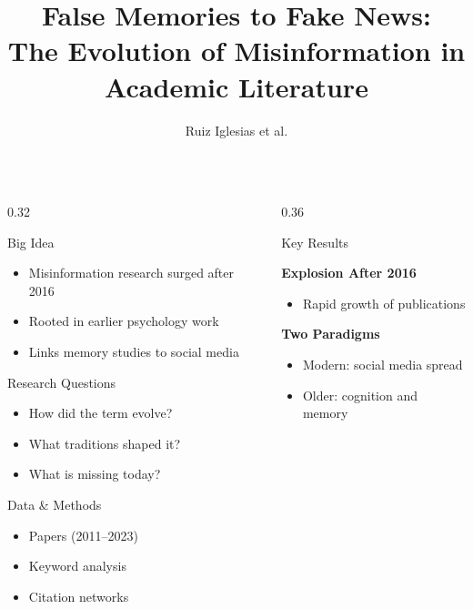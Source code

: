 \documentclass{beamer}
\title{False Memories to Fake News:\\
The Evolution of Misinformation in Academic Literature}
\author{Ruiz Iglesias et al.}
\institute{University of Vermont \\ Computational Story Lab}
\begin{document}
\begin{frame}[t]

\begin{columns}[t,totalwidth=\linewidth]

\begin{column}{0.32\linewidth}

\begin{block}{Big Idea}
\begin{itemize}
\item Misinformation research surged after 2016
\item Rooted in earlier psychology work
\item Links memory studies to social media
\end{itemize}
\end{block}

\begin{block}{Research Questions}
\begin{itemize}
\item How did the term evolve?
\item What traditions shaped it?
\item What is missing today?
\end{itemize}
\end{block}

\begin{block}{Data \& Methods}
\begin{itemize}
\item Papers (2011--2023)
\item Keyword analysis
\item Citation networks
\end{itemize}
\end{block}

\end{column}

\begin{column}{0.36\linewidth}

\begin{block}{Key Results}

\textbf{Explosion After 2016}
\begin{itemize}
\item Rapid growth of publications
\end{itemize}

\vspace{0.5em}

\textbf{Two Paradigms}
\begin{itemize}
\item Modern: social media spread
\item Older: cognition and memory
\end{itemize}


\end{block}
\end{column}
\end{columns}
\end{frame}
\end{document}
